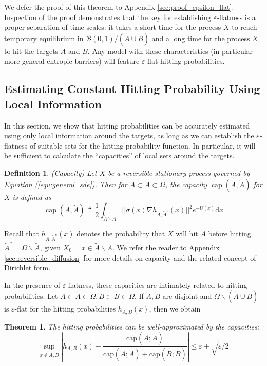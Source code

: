 \documentclass[english, aip, jcp, priprint, graphicx,floatfix]{revtex4-1}
\newtheorem{definition}{Definition}
\newtheorem{theorem}{Theorem}
\theoremstyle{plain}
\theoremstyle{definition}
\theoremstyle{plain}
\newcommand{\capac}[2]{\mathrm{cap}\left(#1;#2\right)}
\newcommand{\bb}[1]{\mathcal{B}\left(#1\right)}
\begin{document}
We defer the proof of this theorem to Appendix \ref{sec:proof_epsilon_flat}. Inspection of the proof demonstrates that the key for establishing $\varepsilon$-flatness is a proper separation of time scales: it takes a short time for the process $X$ to reach temporary equilibrium in $\bb {0, 1} / (\tilde{A} \cup \tilde{B})$ and a long time for the process $X$ to hit the targets $A$ and $B$.  Any model with these characteristics (in particular more general entropic barriers) will feature $\varepsilon$-flat hitting probabilities.

\subsection{Estimating Constant Hitting Probability Using Local Information}

In this section, we show that hitting probabilities can be accurately estimated using only local information around the targets, as long as we can establish the $\varepsilon$-flatness of suitable sets for the hitting probability function. In particular, it will be sufficient to calculate the ``capacities'' of local sets around the targets.

\begin{definition}(Capacity)
Let $X$ be a reversible stationary process governed by Equation (\ref{equ:general_sde}).  Then for $A \subset \tilde{A} \subset \Omega$, the capacity $\ensuremath{\operatorname{cap}} (A, \tilde{A})$ for $X$ is defined as
%
\[ \ensuremath{\operatorname{cap}} (A, \tilde{A}) \triangleq \frac{1}{2} \int_{\tilde A \backslash A}
||\sigma(x) \nabla h_{A, \tilde{A}^c}(x)||^2 e^{- U(x)} \mathrm{d} x \]
%
\end{definition}

Recall that $h_{A, \tilde{A}^c}(x)$ denotes the probability that $X$ will hit $A$ before hitting $\tilde{A}^c=\Omega \backslash \tilde A$, given $X_0=x \in \tilde A\backslash A$.  We refer the reader to Appendix \ref{sec:reversible_diffusion} for more details on capacity and the related concept of Dirichlet form.

In the presence of $\varepsilon$-flatness, these capacities are intimately related to hitting probabilities.  Let $A\subset\tilde A\subset\Omega,B\subset\tilde B\subset\Omega$.  If $\tilde A,\tilde B$ are disjoint and $\Omega \backslash (\tilde A \cup \tilde B)$ is $\varepsilon$-flat for the hitting probabilities $h_{A,B}(x)$, then we obtain

\begin{theorem}\label{thm:main_thm}  The hitting probabilities can be well-approximated by the capacities:
\[ \sup_{x \notin \tilde A,\tilde B} \left| h_{A,B} (x) - \frac{\capac{A}{\tilde A}}{\capac{A}{\tilde A}+\capac{B}{\tilde B}} \right| \leqslant \varepsilon + \sqrt{\varepsilon/2} \]
\end{theorem}
\end{document}
